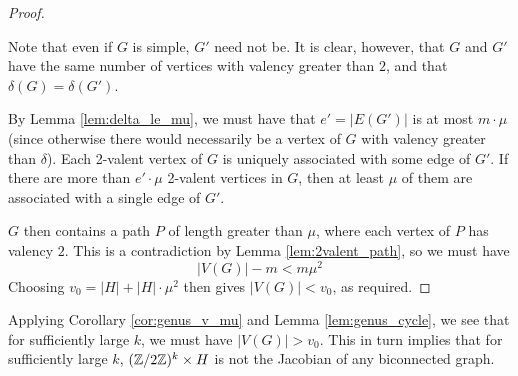 \documentclass{amsart}
\begin{document}
\begin{proof}
\begin{center}
\end{center}

  Note that even if $G$ is simple, $G'$ need not be. It is clear,
  however, that $G$ and $G'$ have the same number of vertices with
  valency greater than $2$, and that $\delta(G) = \delta(G')$.

  By Lemma \ref{lem:delta_le_mu}, we must have that $e' = |E(G')|$ is
  at most $m \cdot \mu$ (since otherwise there would necessarily be a
  vertex of $G$ with valency greater than $\delta$). Each 2-valent
  vertex of $G$ is uniquely associated with some edge of $G'$. If
  there are more than $e' \cdot \mu$ 2-valent vertices in $G$, then at
  least $\mu$ of them are associated with a single edge of $G'$. 

  $G$ then contains a path $P$ of length greater than $\mu$, where
  each vertex of $P$ has valency $2$. This is a contradiction by Lemma
  \ref{lem:2valent_path}, so we must have 
  \[
  |V(G)| - m < m\mu^2
  \] 
  Choosing $v_0 = |H| + |H| \cdot \mu^2$ then gives $|V(G)| < v_0$, as
  required.
\end{proof}

Applying Corollary \ref{cor:genus_v_mu} and Lemma
\ref{lem:genus_cycle}, we see that for sufficiently large $k$, we must
have $|V(G)| > v_0$. This in turn implies that for sufficiently large
$k$, $(\mathbb{Z}/2\mathbb{Z})^k \times H$ is not the Jacobian of any biconnected
graph.\\
\end{document}

